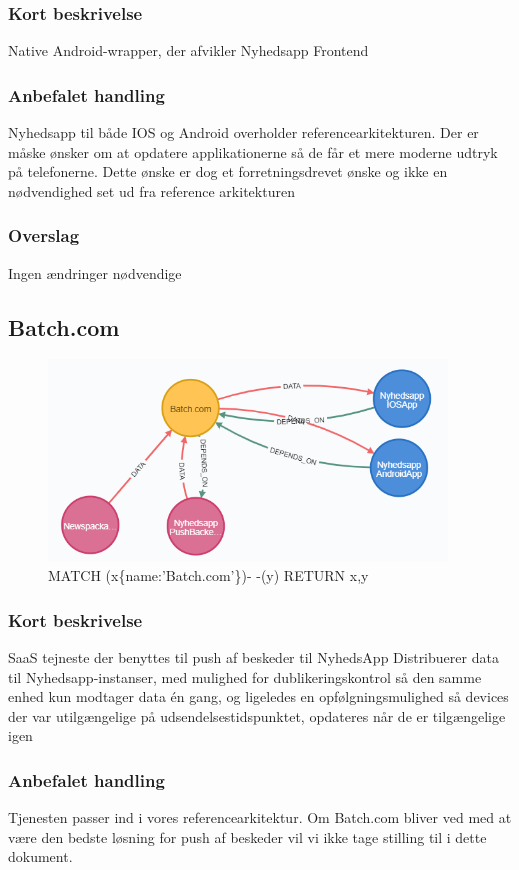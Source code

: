 \documentclass{article}
\begin{document}
\subsubsection{Kort beskrivelse}
Native Android-wrapper, der afvikler Nyhedsapp Frontend
\subsubsection{Anbefalet handling}
Nyhedsapp til både IOS og Android overholder referencearkitekturen. Der er måske ønsker om at opdatere applikationerne så de får et mere moderne udtryk på telefonerne. Dette ønske er dog et forretningsdrevet ønske og ikke en nødvendighed set ud fra reference arkitekturen
\subsubsection{Overslag}
Ingen ændringer nødvendige


\subsection{Batch.com}
\begin{figure}[h]
\includegraphics[width=300pt]{Batch.com.PNG}
\caption{MATCH (x\{name:'Batch.com'\})- -(y) RETURN x,y}
\end{figure}
\subsubsection{Kort beskrivelse}
SaaS tejneste der benyttes til push af beskeder til NyhedsApp
Distribuerer data til Nyhedsapp-instanser, med mulighed for dublikeringskontrol så den samme enhed kun modtager data én gang, og ligeledes en opfølgningsmulighed så devices der var utilgængelige på udsendelsestidspunktet, opdateres når de er tilgængelige igen
\subsubsection{Anbefalet handling}
Tjenesten passer ind i vores referencearkitektur. Om Batch.com bliver ved med at være den bedste løsning for push af beskeder vil vi ikke tage stilling til i dette dokument.
\end{document}
